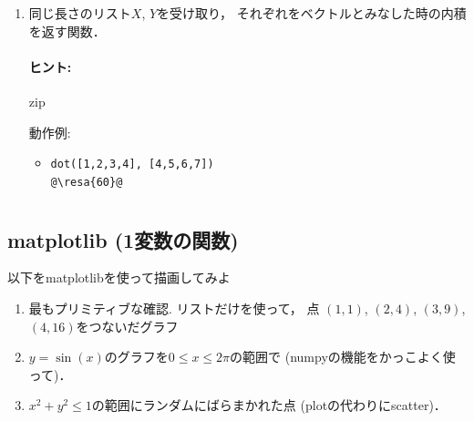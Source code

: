 \documentclass[10pt,dvipdfmx]{article}
\newcommand{\resa}[1]{ {\textsl{$\rightarrow$ #1}}}
\begin{document}
\begin{enumerate}
\paragraph{ヒント:} タプルをうまく使う．Pythonでは二つのタプルの大小関係は，
いわゆる「辞書式順序」と定義されている．
\[ (a, b) \leq (c, d) \iff a < c \mbox{ または } a = c \mbox{ かつ } b \leq d \]
また，{\tt min}はタプルのリストに対しても働く．
\begin{itemize}
\item []
\begin{lstlisting}
def q(x):
    return x * x - 4 * x + 3

minimize_arg(q, a, b)
@\resa{(2.0,-1.0)}@
\end{lstlisting}
\end{itemize}

\item 同じ長さのリスト$X$, $Y$を受け取り，
それぞれをベクトルとみなした時の内積を返す関数．
\paragraph{ヒント:} zip

動作例:
\begin{itemize}
\item []
\begin{lstlisting}
dot([1,2,3,4], [4,5,6,7]) 
@\resa{60}@
\end{lstlisting}
\end{itemize}
\end{enumerate}

\newpage

\section{}
\subsection{{\scriptsize matplotlib (1変数の関数)}}
以下をmatplotlibを使って描画してみよ
\begin{enumerate}
\item 最もプリミティブな確認. リストだけを使って，
点 $(1,1)$, $(2,4)$, $(3,9)$, $(4,16)$をつないだグラフ
\item $y = \sin(x)$のグラフを$0 \leq x \leq 2\pi$の範囲で
{\small (numpyの機能をかっこよく使って)}．
\item $x^2 + y^2 \leq 1$の範囲にランダムにばらまかれた点
{\small (plotの代わりにscatter)}．
\end{enumerate}
\end{document}
